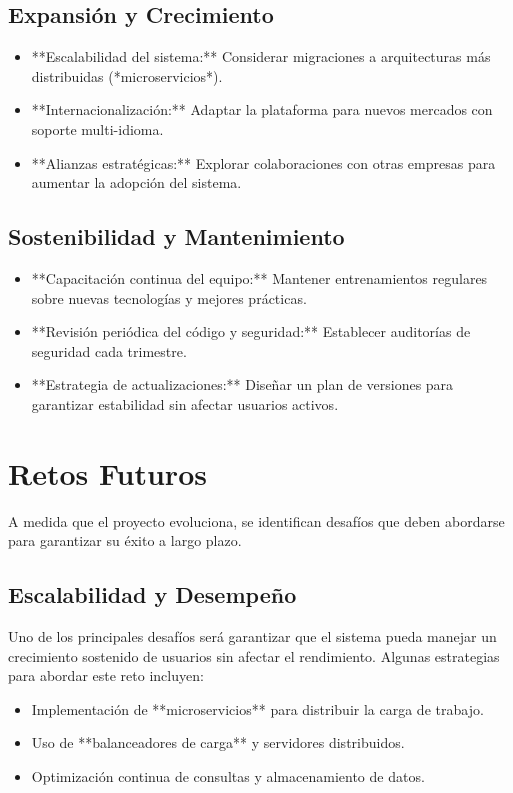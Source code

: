 \subsection{Expansión y Crecimiento}
\begin{itemize}
	\item **Escalabilidad del sistema:** Considerar migraciones a arquitecturas más distribuidas (*microservicios*).
	\item **Internacionalización:** Adaptar la plataforma para nuevos mercados con soporte multi-idioma.
	\item **Alianzas estratégicas:** Explorar colaboraciones con otras empresas para aumentar la adopción del sistema.
\end{itemize}

\subsection{Sostenibilidad y Mantenimiento}
\begin{itemize}
	\item **Capacitación continua del equipo:** Mantener entrenamientos regulares sobre nuevas tecnologías y mejores prácticas.
	\item **Revisión periódica del código y seguridad:** Establecer auditorías de seguridad cada trimestre.
	\item **Estrategia de actualizaciones:** Diseñar un plan de versiones para garantizar estabilidad sin afectar usuarios activos.
\end{itemize}


\section{Retos Futuros}

A medida que el proyecto evoluciona, se identifican desafíos que deben abordarse para garantizar su éxito a largo plazo.

\subsection{Escalabilidad y Desempeño}
Uno de los principales desafíos será garantizar que el sistema pueda manejar un crecimiento sostenido de usuarios sin afectar el rendimiento. Algunas estrategias para abordar este reto incluyen:
\begin{itemize}
	\item Implementación de **microservicios** para distribuir la carga de trabajo.
	\item Uso de **balanceadores de carga** y servidores distribuidos.
	\item Optimización continua de consultas y almacenamiento de datos.
\end{itemize}

